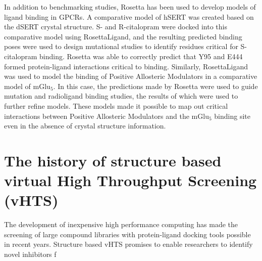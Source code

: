 In addition to benchmarking studies, Rosetta has been used to develop models of ligand binding in GPCRs.
A comparative model of hSERT was created based on the dSERT crystal structure. 
S- and R-citalopram were docked into this comparative model using RosettaLigand, and the resulting predicted binding poses were used to design mutational studies to identify residues critical for S-citalopram binding.
Rosetta was able to correctly predict that Y95 and E444 formed protein-ligand interactions critical to binding\citep{Combs:2011db}.  
Similarly, RosettaLigand was used to model the binding of Positive Allosteric Modulators in a comparative model of mGlu$_{5}$\citep{Turlington:2013et}.
In this case, the predictions made by Rosetta were used to guide mutation and radioligand binding studies, the results of which were used to further refine models.
These models made it possible to map out critical interactions between Positive Allosteric Modulators and the mGlu$_{5}$ binding site even in the absence of crystal structure information.

\section{}

\section{The history of structure based virtual High Throughput Screening (vHTS)} 

The development of inexpensive high performance computing has made the screening of large compound libraries with protein-ligand docking tools possible in recent years.
Structure based vHTS promises to enable researchers to identify novel inhibitors f




